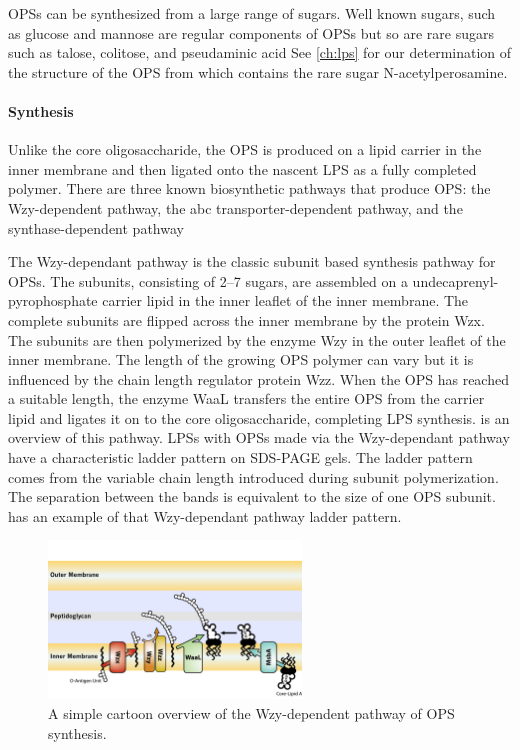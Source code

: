 \Acp{OPS} can be synthesized from a large range of sugars. Well known sugars, such as glucose and mannose are regular components of \acp{OPS} but so are rare sugars such as talose,
colitose, and pseudaminic acid See \cref{ch:lps} for our determination of the structure of the \ac{OPS} from \caulobacter which contains the rare sugar
N-acetylperosamine.

    \paragraph{Synthesis} Unlike the core oligosaccharide, the \ac{OPS} is produced on a lipid carrier in the inner membrane and then ligated onto the nascent \ac{LPS} as a fully
completed polymer. There are three known biosynthetic pathways that produce \ac{OPS}: the Wzy-dependent pathway, the \ac{abc} transporter-dependent pathway, and the
synthase-dependent pathway

The Wzy-dependant pathway is the classic subunit based synthesis pathway for \acp{OPS}. The subunits, consisting of 2--7 sugars, are assembled on a undecaprenyl-pyrophosphate
carrier lipid in the inner leaflet of the inner membrane. The complete subunits are flipped across the inner membrane by the protein Wzx. The subunits are then polymerized by the
enzyme Wzy in the outer leaflet of the inner membrane. The length of the growing \ac{OPS} polymer can vary but it is influenced by the chain length regulator protein Wzz. When the
\ac{OPS} has reached a suitable length, the enzyme WaaL transfers the entire \ac{OPS} from the carrier lipid and ligates it on to the core oligosaccharide, completing \ac{LPS}
synthesis.  is an overview of this pathway. \Acp{LPS} with
\acp{OPS} made via the Wzy-dependant pathway have a characteristic ladder pattern on
\ac{SDS-PAGE} gels. The ladder pattern comes from the variable chain length introduced during subunit polymerization. The separation between the bands is equivalent to the size
of one \ac{OPS} subunit.  has an example of that
Wzy-dependant pathway ladder pattern.

\begin{figure}[htb]
  	\begin{center}
   		\includegraphics[width=0.6\textwidth]{intro/img/lpswzy.pdf}
   	\end{center}
   	\caption[A simple overview of the Wzy-dependent pathway]{ A simple cartoon overview of the Wzy-dependent pathway of \ac{OPS} synthesis. }
\label{fig:lpswzy}
\end{figure}

